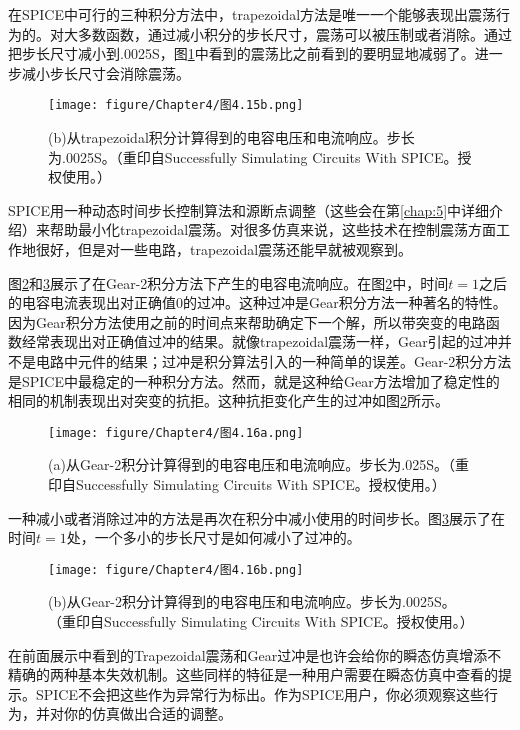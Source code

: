 在SPICE中可行的三种积分方法中，trapezoidal方法是唯一一个能够表现出震荡行为的。对大多数函数，通过减小积分的步长尺寸，震荡可以被压制或者消除。通过把步长尺寸减小到.0025S，图\ref{图4.15b}中看到的震荡比之前看到的要明显地减弱了。进一步减小步长尺寸会消除震荡。

\begin{figure}[htbp]
\small
    \centering
    \texttt{[image: figure/Chapter4/图4.15b.png]}
    \caption{(b)从trapezoidal积分计算得到的电容电压和电流响应。步长为.0025S。（重印自Successfully Simulating Circuits With SPICE。授权使用。）}
    \label{图4.15b}
\end{figure}

SPICE用一种动态时间步长控制算法和源断点调整（这些会在第\ref{chap:5}中详细介绍）来帮助最小化trapezoidal震荡。对很多仿真来说，这些技术在控制震荡方面工作地很好，但是对一些电路，trapezoidal震荡还能早就被观察到。

图\ref{图4.16a}和\ref{图4.16b}展示了在Gear-2积分方法下产生的电容电流响应。在图\ref{图4.16a}中，时间$t=1$之后的电容电流表现出对正确值0的过冲。这种过冲是Gear积分方法一种著名的特性。因为Gear积分方法使用之前的时间点来帮助确定下一个解，所以带突变的电路函数经常表现出对正确值过冲的结果。就像trapezoidal震荡一样，Gear引起的过冲并不是电路中元件的结果；过冲是积分算法引入的一种简单的误差。Gear-2积分方法是SPICE中最稳定的一种积分方法。然而，就是这种给Gear方法增加了稳定性的相同的机制表现出对突变的抗拒。这种抗拒变化产生的过冲如图\ref{图4.16a}所示。
\begin{figure}[htbp]
\small
    \centering
    \texttt{[image: figure/Chapter4/图4.16a.png]}
    \caption{(a)从Gear-2积分计算得到的电容电压和电流响应。步长为.025S。（重印自Successfully Simulating Circuits With SPICE。授权使用。）}
    \label{图4.16a}
\end{figure}

一种减小或者消除过冲的方法是再次在积分中减小使用的时间步长。图\ref{图4.16b}展示了在时间$t=1$处，一个多小的步长尺寸是如何减小了过冲的。
\begin{figure}[htbp]
\small
    \centering
    \texttt{[image: figure/Chapter4/图4.16b.png]}
    \caption{(b)从Gear-2积分计算得到的电容电压和电流响应。步长为.0025S。（重印自Successfully Simulating Circuits With SPICE。授权使用。）}
    \label{图4.16b}
\end{figure}

在前面展示中看到的Trapezoidal震荡和Gear过冲是也许会给你的瞬态仿真增添不精确的两种基本失效机制。这些同样的特征是一种用户需要在瞬态仿真中查看的提示。SPICE不会把这些作为异常行为标出。作为SPICE用户，你必须观察这些行为，并对你的仿真做出合适的调整。

